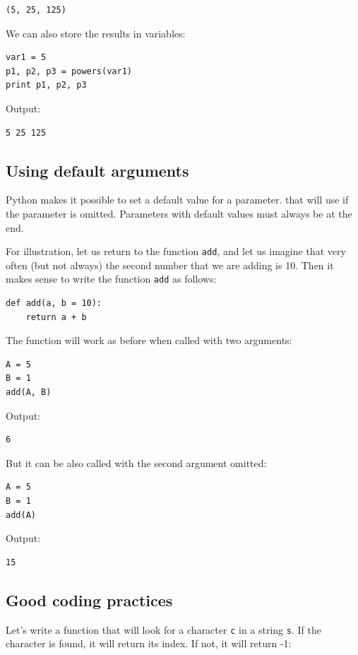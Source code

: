 \documentclass[article,A4,12pt]{llncs}
\begin{document}
\begin{verbatim}
(5, 25, 125)
\end{verbatim}
We can also store the results in variables:

\begin{verbatim}
var1 = 5
p1, p2, p3 = powers(var1)
print p1, p2, p3
\end{verbatim}
Output:

\begin{verbatim}
5 25 125
\end{verbatim}

\subsection{Using default arguments}

Python makes it possible to set a default value for a parameter.
that will use if the parameter is omitted. Parameters with 
default values must always be at the end. 

For illustration, let us return to the function {\tt add}, and let us 
imagine that very often (but not always) the second number that we
are adding is 10. Then it makes sense to write the function {\tt add}
as follows:

\begin{verbatim}
def add(a, b = 10):
    return a + b
\end{verbatim}
The function will work as before when called with two arguments: 

\begin{verbatim}
A = 5
B = 1
add(A, B)
\end{verbatim}
Output:
\begin{verbatim}
6
\end{verbatim}
But it can be also called with the second argument omitted:
\begin{verbatim}
A = 5
B = 1
add(A)
\end{verbatim}
Output:
\begin{verbatim}
15
\end{verbatim}

\subsection{Good coding practices}

Let's write a function that will look for a character {\tt c} 
in a string {\tt s}. If the character is found, it will return its index. 
If not, it will return -1:
\end{document}
